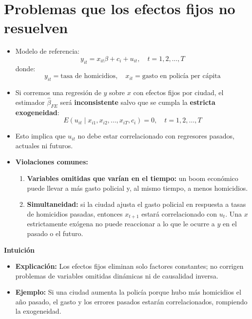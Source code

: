\documentclass[12pt]{article}
\begin{document}
\section*{\noindent\textbf{Problemas que los efectos fijos no resuelven}}

\begin{itemize}
    \item Modelo de referencia:
    \[
    y_{it} = x_{it}\beta + c_i + u_{it}, \quad t = 1,2,\ldots,T
    \]
    donde:
    \[
    y_{it} = \text{tasa de homicidios}, \quad x_{it} = \text{gasto en policía per cápita}
    \]
    
    \item Si corremos una regresión de $y$ sobre $x$ con efectos fijos por ciudad, el estimador $\hat{\beta}_{FE}$ será \textbf{inconsistente} salvo que se cumpla la \textbf{estricta exogeneidad}:
    \[
    E(u_{it} \mid x_{i1}, x_{i2}, \ldots, x_{iT}, c_i) = 0, \quad t = 1,2,\ldots,T
    \]
    
    \item Esto implica que $u_{it}$ no debe estar correlacionado con regresores pasados, actuales ni futuros.
    
    \item \textbf{Violaciones comunes:}
    \begin{enumerate}
        \item \textbf{Variables omitidas que varían en el tiempo:} un boom económico puede llevar a más gasto policial y, al mismo tiempo, a menos homicidios.
        \item \textbf{Simultaneidad:} si la ciudad ajusta el gasto policial en respuesta a tasas de homicidios pasadas, entonces $x_{t+1}$ estará correlacionado con $u_t$.  
        Una $x$ estrictamente exógena no puede reaccionar a lo que le ocurre a $y$ en el pasado o el futuro.
    \end{enumerate}
\end{itemize}

\noindent\textbf{Intuición}
\begin{itemize}
    \item \textbf{Explicación:} Los efectos fijos eliminan solo factores constantes; no corrigen problemas de variables omitidas dinámicas ni de causalidad inversa.
    \item \textbf{Ejemplo:} Si una ciudad aumenta la policía porque hubo más homicidios el año pasado, el gasto y los errores pasados estarán correlacionados, rompiendo la exogeneidad.
\end{itemize}
\end{document}
